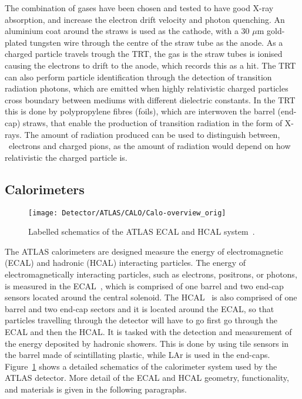 \begin{description}
	The combination of gases have been chosen and tested to have good X-ray absorption, and increase the electron drift velocity and photon quenching.
	An aluminium coat around the straws is used as the cathode, with a 30 $\mu$m gold-plated tungsten wire through the centre of the straw tube as the anode. As a charged particle travels trough the \ac{TRT}, the gas is the straw tubes is ionised causing the electrons to drift to the anode, which records this as a hit.
	The \ac{TRT} can also perform particle identification through the detection of transition radiation photons, which are emitted when highly relativistic charged particles cross boundary between mediums with different dielectric constants. In the \ac{TRT} this is done by polypropylene fibres (foils), which are interwoven the barrel (end-cap) straws, that enable the production of transition radiation in the form of X-rays. The amount of radiation produced can be used to distinguish between, \eg\ electrons and charged pions, as the amount of radiation would depend on how relativistic the charged particle is. 
	\end{description}
	\subsection{Calorimeters}
	\label{subsec:calo}
		\begin{figure}[!hbt]
		\centering
		\texttt{[image: Detector/ATLAS/CALO/Calo-overview\_orig]}
		\caption{Labelled schematics of the \ac{ATLAS} \ac{ECAL} and \ac{HCAL} system~\cite{ATLASJINST}.}
		\label{fig:calorimeters}
		\end{figure}
	The \ac{ATLAS} calorimeters are designed measure the energy of electromagnetic (\ac{ECAL}) and hadronic (\ac{HCAL}) interacting particles. 
	The energy of electromagnetically interacting particles, such as  electrons, positrons, or photons, is measured in the \ac{ECAL}~\cite{ATLASLAR}, which is comprised of one barrel and two end-cap sensors located around the central solenoid.
	The \ac{HCAL}~\cite{CERN-LHCC-2017-019} is also comprised of one barrel and two end-cap sectors and it is located around the \ac{ECAL}, so that particles travelling through the detector will have to go first go through the \ac{ECAL} and then the \ac{HCAL}. 
	It is tasked with the detection and measurement of the energy deposited by hadronic showers. 
	This is done by using tile sensors in the barrel made of scintillating plastic, while \ac{LAr} is used in the end-caps.
	Figure~\ref{fig:calorimeters} shows a detailed schematics of the calorimeter system used by the \ac{ATLAS} detector.
	More detail of the \ac{ECAL} and \ac{HCAL} geometry, functionality, and materials is given in the following paragraphs. 
	
